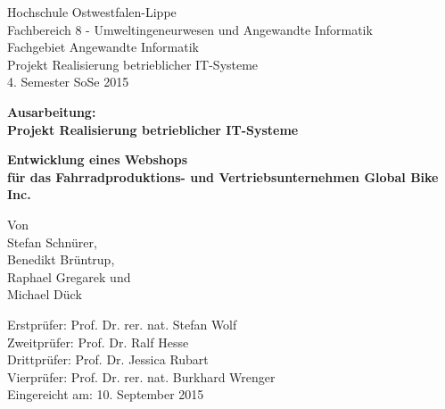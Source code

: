 \documentclass[12pt, a4paper]{article}
\begin{document}

\begin{titlepage}
Hochschule Ostwestfalen-Lippe \\
Fachbereich 8 - Umweltingeneurwesen und Angewandte Informatik \\
Fachgebiet Angewandte Informatik \\
Projekt Realisierung betrieblicher IT-Systeme \\
4. Semester SoSe 2015\\
\vspace{2cm}

\begin{center}
\begin{Large}
\textbf{Ausarbeitung: \\Projekt Realisierung betrieblicher IT-Systeme } \\
\end{Large}
\vspace{2cm}

\begin{Large}
\textbf {Entwicklung eines Webshops\\ für das Fahrradproduktions- und Vertriebsunternehmen Global Bike Inc.} \\[0.35cm]
\end{Large}
\vspace{5mm}
Von \\[0.25cm]
Stefan Schnürer,\\[0.25cm]
Benedikt Brüntrup,\\[0.25cm]
Raphael Gregarek und\\[0.25cm]
Michael Dück
\end{center}

\vfill
Erstprüfer: Prof. Dr. rer. nat. Stefan Wolf\\
Zweitprüfer: Prof. Dr. Ralf Hesse\\
Drittprüfer: Prof. Dr. Jessica Rubart\\
Vierprüfer: Prof. Dr. rer. nat. Burkhard Wrenger\\[0.25cm]
Eingereicht am: 10. September 2015
\end{titlepage}


\hspace{1pt}
\tableofcontents
\vfill













\end{document}
